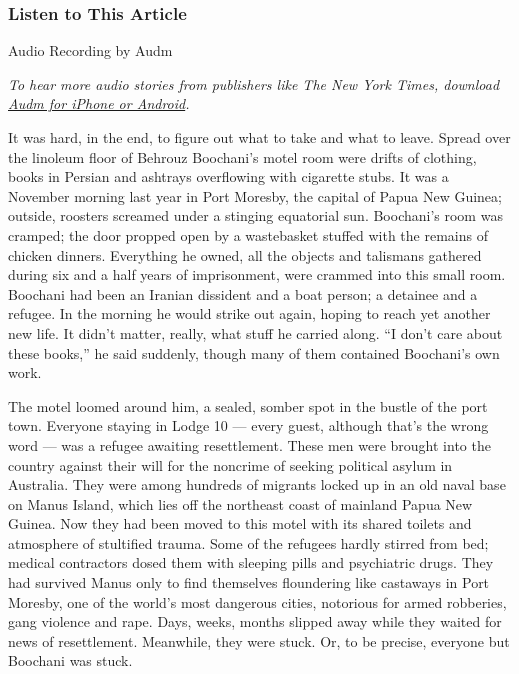 \hypertarget{listen-to-this-article}{%
\subsubsection{Listen to This Article}\label{listen-to-this-article}}

Audio Recording by Audm

\emph{To hear more audio stories from publishers like The New York
Times, download}
\href{https://www.audm.com/?utm_source=nytmag\&utm_medium=embed\&utm_campaign=solitary_soul_stack}{\emph{Audm
for iPhone or Android}}\emph{.}

It was hard, in the end, to figure out what to take and what to leave.
Spread over the linoleum floor of Behrouz Boochani's motel room were
drifts of clothing, books in Persian and ashtrays overflowing with
cigarette stubs. It was a November morning last year in Port Moresby,
the capital of Papua New Guinea; outside, roosters screamed under a
stinging equatorial sun. Boochani's room was cramped; the door propped
open by a wastebasket stuffed with the remains of chicken dinners.
Everything he owned, all the objects and talismans gathered during six
and a half years of imprisonment, were crammed into this small room.
Boochani had been an Iranian dissident and a boat person; a detainee and
a refugee. In the morning he would strike out again, hoping to reach yet
another new life. It didn't matter, really, what stuff he carried along.
``I don't care about these books,'' he said suddenly, though many of
them contained Boochani's own work.

The motel loomed around him, a sealed, somber spot in the bustle of the
port town. Everyone staying in Lodge 10 --- every guest, although that's
the wrong word --- was a refugee awaiting resettlement. These men were
brought into the country against their will for the noncrime of seeking
political asylum in Australia. They were among hundreds of migrants
locked up in an old naval base on Manus Island, which lies off the
northeast coast of mainland Papua New Guinea. Now they had been moved to
this motel with its shared toilets and atmosphere of stultified trauma.
Some of the refugees hardly stirred from bed; medical contractors dosed
them with sleeping pills and psychiatric drugs. They had survived Manus
only to find themselves floundering like castaways in Port Moresby, one
of the world's most dangerous cities, notorious for armed robberies,
gang violence and rape. Days, weeks, months slipped away while they
waited for news of resettlement. Meanwhile, they were stuck. Or, to be
precise, everyone but Boochani was stuck.

